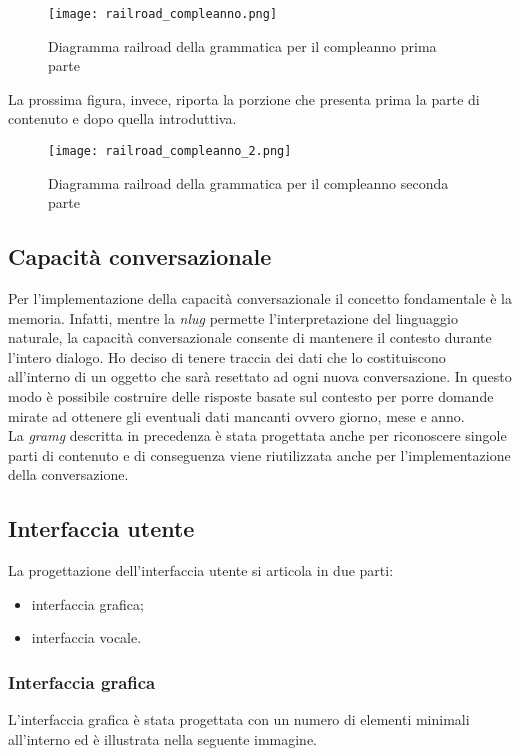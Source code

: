 	\begin{figure}[htbp]
		\begin{center}
			\texttt{[image: railroad\_compleanno.png]}
			\caption{Diagramma railroad della grammatica per il compleanno prima parte}
		\end{center}
	\end{figure}

	La prossima figura, invece, riporta la porzione che presenta prima la parte di contenuto e dopo quella introduttiva.
	\begin{figure}[htbp]
		\begin{center}
			\texttt{[image: railroad\_compleanno\_2.png]}
			\caption{Diagramma railroad della grammatica per il compleanno seconda parte}
		\end{center}
	\end{figure}

	\subsection{Capacità conversazionale}
	Per l'implementazione della capacità conversazionale il concetto fondamentale è la memoria. Infatti, mentre la \emph{\gls{nlug}} permette l'interpretazione del linguaggio naturale, la capacità conversazionale consente di mantenere il contesto durante l'intero dialogo. Ho deciso di tenere traccia dei dati che lo costituiscono all'interno di un oggetto che sarà resettato ad ogni nuova conversazione. In questo modo è possibile costruire delle risposte basate sul contesto per porre domande mirate ad ottenere gli eventuali dati mancanti ovvero giorno, mese e anno. \\
	La \emph{\gls{gramg}} descritta in precedenza è stata progettata anche per riconoscere singole parti di contenuto e di conseguenza viene riutilizzata anche per l'implementazione della conversazione. 
	\subsection{Interfaccia utente}
	La progettazione dell'interfaccia utente si articola in due parti:
	\begin{itemize}
		\item interfaccia grafica;
		\item interfaccia vocale.
	\end{itemize}
		\subsubsection{Interfaccia grafica}
		L'interfaccia grafica è stata progettata con un numero di elementi minimali all'interno ed è illustrata nella seguente immagine.
		
